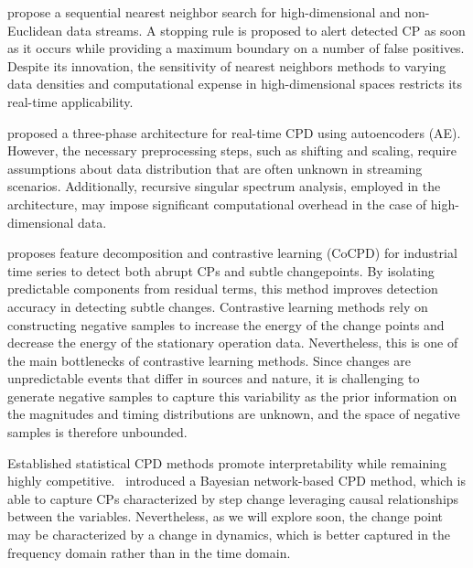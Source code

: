 \citet{Chu2022} propose a sequential nearest neighbor search for high-dimensional and non-Euclidean data streams. A stopping rule is proposed to alert detected CP as soon as it occurs while providing a maximum boundary on a number of false positives. Despite its innovation, the sensitivity of nearest neighbors methods to varying data densities and computational expense in high-dimensional spaces restricts its real-time applicability.

\citet{Gupta2022} proposed a three-phase architecture for real-time CPD using autoencoders (AE). However, the necessary preprocessing steps, such as shifting and scaling, require assumptions about data distribution that are often unknown in streaming scenarios. Additionally, recursive singular spectrum analysis, employed in the architecture, may impose significant computational overhead in the case of high-dimensional data.

\citet{Bao2024} proposes feature decomposition and contrastive learning (CoCPD) for industrial time series to detect both abrupt CPs and subtle changepoints. By isolating predictable components from residual terms, this method improves detection accuracy in detecting subtle changes. Contrastive learning methods rely on constructing negative samples to increase the energy of the change points and decrease the energy of the stationary operation data. Nevertheless, this is one of the main bottlenecks of contrastive learning methods. Since changes are unpredictable events that differ in sources and nature, it is challenging to generate negative samples to capture this variability as the prior information on the magnitudes and timing distributions are unknown, and the space of negative samples is therefore unbounded.

Established statistical CPD methods promote interpretability while remaining highly competitive.~\citet{Rajaganapathy2022} introduced a Bayesian network-based CPD method, which is able to capture CPs characterized by step change leveraging causal relationships between the variables. Nevertheless, as we will explore soon, the change point may be characterized by a change in dynamics, which is better captured in the frequency domain rather than in the time domain.


